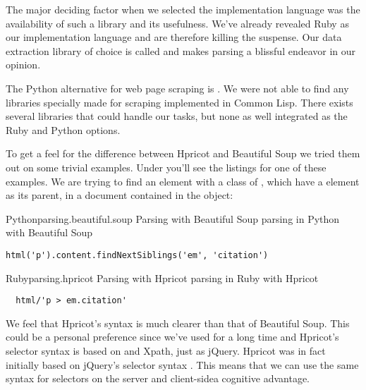 The major deciding factor when we selected the implementation language was
the availability of such a library and its usefulness. We've already
revealed Ruby as our implementation language and are therefore killing the
suspense. Our data extraction library of choice is called %
and makes  parsing a blissful endeavor in our opinion.

The Python alternative for web page scraping is .
We were not able to find any libraries specially made for  scraping
implemented in Common Lisp. There exists several %
libraries that could handle our tasks, but none as well integrated as
the Ruby and Python options.

To get a feel for the difference between Hpricot and Beautiful Soup we tried
them out on some trivial examples. Under you'll see the listings for one
of these examples. We are trying to find an  element with a class
of , which have a  element as its parent,
in a  document contained in the  object:

\begin{scode}{Python}{parsing.beautiful.soup}{%
  Parsing with Beautiful Soup}{%
   parsing in Python with Beautiful Soup}
\begin{lstlisting}
html('p').content.findNextSiblings('em', 'citation')
\end{lstlisting}
\end{scode}

\begin{scode}{Ruby}{parsing.hpricot}{%
  Parsing with Hpricot}{%
   parsing in Ruby with Hpricot}
\begin{lstlisting}
  html/'p > em.citation'
\end{lstlisting}
\end{scode}

We feel that Hpricot's syntax is much clearer than that of Beautiful Soup.
This could be a personal preference since we've used  for a long
time and Hpricot's selector syntax is based on  and Xpath, just as
jQuery. Hpricot was in fact initially based on jQuery's selector syntax
\citep{why06}. This means that we can use the same syntax for selectors on the
server and client-side\emph{}a cognitive advantage.


